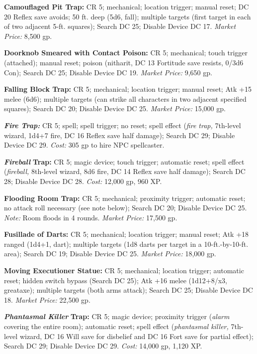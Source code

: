 \documentclass{article}
\begin{document}
\textbf{Camouflaged Pit Trap:} CR 5; mechanical; location trigger; manual reset; 
DC 20 Reflex save avoids; 50 ft. deep (5d6, fall); multiple targets (first target 
in each of two adjacent 5-ft. squares); Search DC 25; Disable Device DC 17. \textit{Market 
Price: }8,500 gp.

\textbf{Doorknob Smeared with Contact Poison: }CR 5; mechanical; touch trigger 
(attached); manual reset; poison (nitharit, DC 13 Fortitude save resists, 0/3d6 
Con); Search DC 25; Disable Device DC 19. \textit{Market Price: }9,650 gp.

\textbf{Falling Block Trap:} CR 5; mechanical; location trigger; manual reset; 
Atk +15 melee (6d6); multiple targets (can strike all characters in two adjacent 
specified squares); Search DC 20; Disable Device DC 25. \textit{Market Price: }15,000 
gp.

\textit{\textbf{Fire Trap: }}CR 5; spell; spell trigger; no reset; spell effect 
(\textit{fire trap, }7th-level wizard, 1d4+7 fire, DC 16 Reflex save half damage); 
Search DC 29; Disable Device DC 29. \textit{Cost: }305 gp to hire NPC spellcaster.

\textit{\textbf{Fireball }}\textbf{Trap: }CR 5; magic device; touch trigger; automatic 
reset; spell effect (\textit{fireball, }8th-level wizard, 8d6 fire, DC 14 Reflex 
save half damage); Search DC 28; Disable Device DC 28. \textit{Cost: }12,000 gp, 
960 XP.

\textbf{Flooding Room Trap:} CR 5; mechanical; proximity trigger; automatic reset; 
no attack roll necessary (see note below); Search DC 20; Disable Device DC 25. 
\textit{Note: }Room floods in 4 rounds. \textit{Market Price: }17,500 gp.

\textbf{Fusillade of Darts:} CR 5; mechanical; location trigger; manual reset; 
Atk +18 ranged (1d4+1, dart); multiple targets (1d8 darts per target in a 10-ft.-by-10-ft. 
area); Search DC 19; Disable Device DC 25. \textit{Market Price: }18,000 gp.

\textbf{Moving Executioner Statue: }CR 5; mechanical; location trigger; automatic 
reset; hidden switch bypass (Search DC 25); Atk +16 melee (1d12+8/x3, greataxe); 
multiple targets (both arms attack); Search DC 25; Disable Device DC 18. \textit{Market 
Price: }22,500 gp.

\textit{\textbf{Phantasmal Killer }}\textbf{Trap: }CR 5; magic device; proximity 
trigger (\textit{alarm }covering the entire room); automatic reset; spell effect 
(\textit{phantasmal killer, }7th-level wizard, DC 16 Will save for disbelief and 
DC 16 Fort save for partial effect); Search DC 29; Disable Device DC 29. \textit{Cost: 
}14,000 gp, 1,120 XP.
\end{document}
